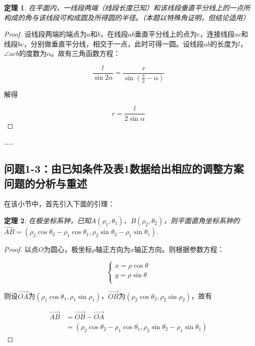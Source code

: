 \newtheorem{mythm}{定理}[section]
\begin{mythm}
    在平面内，一线段两端（线段长度已知）和该线段垂直平分线上的一点所构成的角与该线段可构成圆及所得圆的半径。（本题以特殊角证明，但结论适用）
\end{mythm}

\begin{proof}
    设线段两端的端点为$a$和$b$，在线段$ab$垂直平分线上的点为$c$，连接线段$ac$和线段$bc$，分别做垂直平分线，相交于一点，此时可得一圆。设线段$ab$的长度为$l$，$\angle acb$的度数为$\alpha$。故有三角函数方程：

    \begin{equation}
        \frac{l}{\sin 2\alpha}=
        \frac{r}{\sin(\frac{\pi}{2}-\alpha)}
    \end{equation}

    解得

    \begin{equation}
        r=\frac{l}{2\sin\alpha}
    \end{equation}
\end{proof}

……


\subsection{问题1-3：由已知条件及表1数据给出相应的调整方案
问题的分析与重述}

在该小节中，首先引入下面的引理：

\begin{mythm}
    在极坐标系钟，已知$A(\rho_1, \theta_1)$、$B(\rho_2, \theta_2)$，则平面直角坐标系钟的$\widehat{AB}=(\rho_2\cos\theta_2 - \rho_1\cos\theta_1, \rho_2\sin\theta_2 - \rho_1\sin\theta_1)$.
\end{mythm}

\begin{proof}
    以点$O$为圆心，极坐标$\rho$轴正方向为$x$轴正方向。则根据参数方程：

    \begin{equation*}
        \begin{cases}
            x = \rho\cos\theta\\
            y = \rho\sin\theta\\
        \end{cases}
    \end{equation*}

    则设$\overrightarrow{OA}$为$(\rho_1\cos\theta_1, \rho_1\sin\rho_1)$，$\overrightarrow{OB}$为$(\rho_2\cos\theta_2, \rho_2\sin\rho_2)$，故有

    \begin{equation}
        \begin{aligned}
            \overrightarrow{AB} &= \overrightarrow{OB} - \overrightarrow{OA} \\
            &=(\rho_2\cos\theta_2 - \rho_1\cos\theta_1, \rho_2\sin\theta_2 - \rho_1\sin\theta_1)
        \end{aligned}
    \end{equation}
\end{proof}

